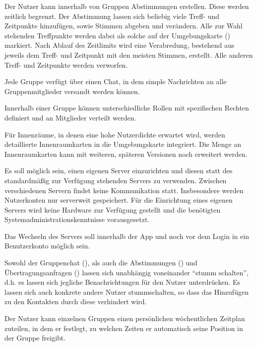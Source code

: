 \documentclass[parskip=full,11pt]{scrartcl}
\begin{document}
%
Der Nutzer kann innerhalb von Gruppen Abstimmungen erstellen.
Diese werden zeitlich begrenzt.
Der Abstimmung lassen sich beliebig viele Treff- und Zeitpunkte hinzufügen,
sowie Stimmen abgeben und verändern.
Alle zur Wahl stehenden Treffpunkte werden dabei als solche auf der
Umgebungskarte () markiert.
Nach Ablauf des Zeitlimits wird eine Verabredung, bestehend aus jeweils dem
Treff- und Zeitpunkt mit den meisten Stimmen, erstellt.
Alle anderen Treff- und Zeitpunkte werden verworfen.

%
Jede Gruppe verfügt über einen Chat, in dem simple Nachrichten an alle
Gruppenmitglieder versandt werden können.

Innerhalb einer Gruppe können unterschiedliche Rollen
mit spezifischen Rechten definiert und an Mitglieder verteilt werden.

%
Für Innenräume, in denen eine hohe Nutzerdichte erwartet wird, werden
detaillierte Innenraumkarten in die Umgebungskarte integriert. Die Menge an
Innenraumkarten kann mit weiteren, späteren Versionen noch erweitert werden.

%
Es soll möglich sein, einen eigenen Server einzurichten und diesen statt des
standardmäßig zur Verfügung stehenden Servers zu verwenden.
Zwischen verschiedenen Servern findet keine Kommunikation statt.
Insbesondere werden Nutzerkonten nur serverweit gespeichert.
Für die Einrichtung eines eigenen Servers wird keine Hardware zur Verfügung
gestellt und die benötigten Systemadministrationskenntnisse vorausgesetzt.

%
Das Wechseln des Servers soll innerhalb der App und noch vor dem Login in ein
Benutzerkonto möglich sein.

%
Sowohl der Gruppenchat (), als auch die
Abstimmungen () und Übertragungsanfragen
() lassen sich unabhängig voneinander
\enquote{stumm schalten}, d.h. es lassen sich jegliche Benachrichtungen für den
Nutzer unterdrücken.
Es lassen sich auch konkrete andere Nutzer stummschalten, so dass das
Hinzufügen zu den Kontakten durch diese verhindert wird.

%
Der Nutzer kann einzelnen Gruppen einen persönlichen wöchentlichen Zeitplan
zuteilen, in dem er festlegt, zu welchen Zeiten er automatisch seine Position
in der Gruppe freigibt.
\end{document}
